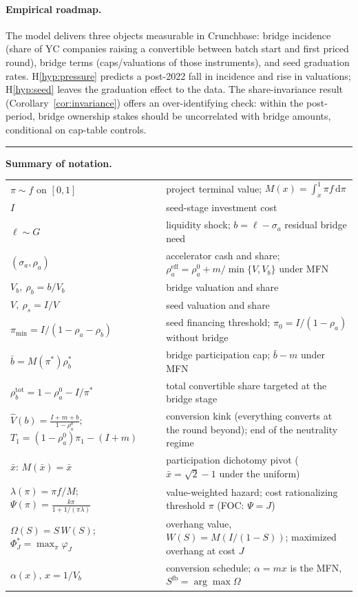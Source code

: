 \documentclass[11pt]{article}
\theoremstyle{definition}
\newcommand{\pimin}{\pi_{\min}}
\newcommand{\dd}{\,\mathrm{d}}
\begin{document}
\paragraph{Empirical roadmap.} The model delivers three objects measurable in Crunchbase: bridge incidence (share of YC companies raising a convertible between batch start and first priced round), bridge terms (caps/valuations of those instruments), and seed graduation rates. H\ref{hyp:pressure} predicts a post-2022 fall in incidence and rise in valuations; H\ref{hyp:seed} leaves the graduation effect to the data. The share-invariance result (Corollary~\ref{cor:invariance}) offers an over-identifying check: within the post-period, bridge ownership stakes should be uncorrelated with bridge amounts, conditional on cap-table controls.

\bigskip
\begin{center}
\rule{0.3\textwidth}{0.4pt}
\end{center}
\bigskip

\noindent\textbf{Summary of notation.}
\begin{center}
\begin{tabular}{ll}
\toprule
$\pi \sim f$ on $[0,1]$ & project terminal value; $M(x)=\int_x^1 \pi f\dd\pi$ \\
$I$ & seed-stage investment cost \\
$\ell \sim G$ & liquidity shock; $b = \ell - \sigma_a$ residual bridge need \\
$(\sigma_a, \rho_a)$ & accelerator cash and share; $\rho_a^{\mathrm{eff}} = \rho_a^0 + m/\min\{V,V_b\}$ under MFN \\
$V_b,\ \rho_b = b/V_b$ & bridge valuation and share \\
$V,\ \rho_s = I/V$ & seed valuation and share \\
$\pimin = I/(1-\rho_a-\rho_b)$ & seed financing threshold; $\pi_0 = I/(1-\rho_a)$ without bridge \\
$\bar b = M(\pi^{*})\rho_b^{*}$ & bridge participation cap; $\bar b - m$ under MFN \\
$\rho_b^{\mathrm{tot}} = 1-\rho_a^0-I/\pi^{*}$ & total convertible share targeted at the bridge stage \\
$\hat V(b)=\frac{I+m+b}{1-\rho_a^0}$; $T_1=(1{-}\rho_a^0)\pi_1-(I{+}m)$ & conversion kink (everything converts at the round beyond); end of the neutrality regime \\
$\bar x$: $M(\bar x)=\bar x$ & participation dichotomy pivot ($\bar x=\sqrt{2}-1$ under the uniform) \\
$\lambda(\pi)=\pi f/M$; $\Psi(\pi)=\frac{k\pi}{1+1/(\pi\lambda)}$ & value-weighted hazard; cost rationalizing threshold $\pi$ (FOC: $\Psi=J$) \\
$\Omega(S)=S\,W(S)$; $\Phi^{*}_J=\max_\pi\varphi_J$ & overhang value, $W(S)=M(I/(1{-}S))$; maximized overhang at cost $J$ \\
$\alpha(x)$, $x=1/V_b$ & conversion schedule; $\alpha=mx$ is the MFN, $S^{\mathrm{fb}}=\arg\max\Omega$ \\
\bottomrule
\end{tabular}
\end{center}
\end{document}
